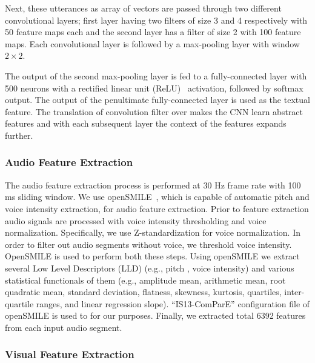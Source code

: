 \documentclass[review]{elsarticle}
\newcommand\?[1]{\hl{#1}}
\begin{document}
Next, these utterances as array of vectors are passed through two different
convolutional layers; first layer having two filters of size 3 and 4
respectively with 50 feature maps each and the second layer has a filter of size
2 with 100 feature maps. Each convolutional layer is followed by a max-pooling
layer with window $2\times 2$.

The output of the second max-pooling layer is fed to a fully-connected layer
with 500 neurons with a rectified linear unit (ReLU)~\citep{whyeteh2001rate}
activation, followed by softmax output. The output of the penultimate
fully-connected layer is used as the textual feature. The translation of
convolution filter over makes the CNN learn abstract features and with each
subsequent layer the context of the features expands further.







\subsubsection{Audio Feature Extraction}
\label{audio}

The audio feature extraction process is performed at 30 Hz frame rate with 100
ms sliding window. We use openSMILE~\citep{eyben2010opensmile}, which is capable
of automatic pitch and voice intensity extraction, for audio feature
extraction. Prior to feature extraction audio signals are processed with voice
intensity thresholding and voice normalization. Specifically, we use
Z-standardization for voice normalization. In order to filter out audio segments
without voice, we threshold voice intensity. OpenSMILE is used to perform both
these steps. Using openSMILE we extract several Low Level Descriptors (LLD)
(e.g., pitch , voice intensity) and various statistical functionals of them
(e.g., amplitude mean, arithmetic mean, root quadratic mean, standard deviation,
flatness, skewness, kurtosis, quartiles, inter-quartile ranges, and linear
regression slope). ``IS13-ComParE'' configuration file of openSMILE is used to
for our purposes. Finally, we extracted total 6392 features from each input
audio segment.





\subsubsection{Visual Feature Extraction}
\label{visual}
\end{document}
